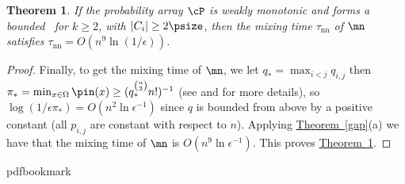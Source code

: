 \documentclass[11pt]{article}
\newtheorem{theorem}{Theorem}[section]
\providecommand{\expref}[2]{\texorpdfstring{\hyperref[#2]{#1~\ref{#2}}}{#1~\ref{#2}}}
\begin{document}
\begin{theorem}\label{mnMixing} If the %
%
probability array $\cP$ is
weakly monotonic and
%
forms  %
a bounded \kP\, for $k\geq 2$, with $|C_i|\geq 2\psize$, 
then the mixing time $\tau_{\text{nn}}$ of $\mn$ satisfies 
$\tau_{\text{nn}} = O(n^{9}\ln(1/\epsilon))$.
\end{theorem}
\begin{proof}
Finally, to get the mixing time of $\mn$, we let $q_* =
\max_{i<j} q_{i,j}$ then $\pi_* =  \min_{x\in \Omega}\pin(x)
\geq (q_*^{\binom{n}{2}}n!)^{-1}$ (see \cite{bmrs} and \cite{MS} for
more details), so $\log(1/\epsilon \pi_*) = O(n^2\ln \epsilon^{-1})$
since $q$ is bounded from above by a positive constant (all $p_{i,j}$ are constant with respect to $n$).  Applying
\expref{Theorem}{gap}(a) we have that the
mixing time of $\mn$ is $O(n^9\ln\epsilon^{-1})$.  This proves
\expref{Theorem}{mnMixing}.
\end{proof}


\newcommand{\prelim}{Preliminary version in\ }\newcommand{\prelims}{Preliminary
  versions in\ }
\providecommand{\bibhead}[1]{}
\expandafter\ifx\csname pdfbookmark\endcsname\relax%
  \providecommand{\tocrefpdfbookmark}{}
\else\providecommand{\tocrefpdfbookmark}{%
   \hypertarget{tocreferences}{}%
   \pdfbookmark[1]{References}{tocreferences}}%
\fi
\end{document}
